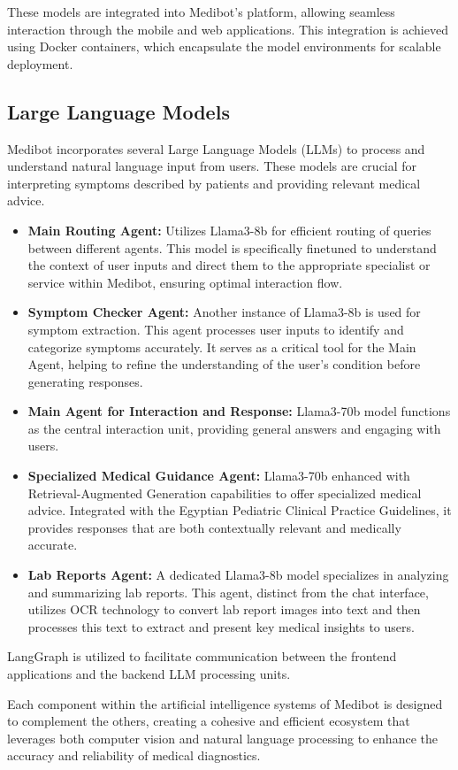 These models are integrated into Medibot’s platform, allowing seamless interaction through the mobile and web applications. This integration is achieved using Docker containers, which encapsulate the model environments for scalable deployment.

\subsection{Large Language Models}
Medibot incorporates several Large Language Models (LLMs) to process and understand natural language input from users. These models are crucial for interpreting symptoms described by patients and providing relevant medical advice.

\begin{itemize}
    \item \textbf{Main Routing Agent:} Utilizes Llama3-8b for efficient routing of queries between different agents. This model is specifically finetuned to understand the context of user inputs and direct them to the appropriate specialist or service within Medibot, ensuring optimal interaction flow.
    
    \item \textbf{Symptom Checker Agent:} Another instance of Llama3-8b is used for symptom extraction. This agent processes user inputs to identify and categorize symptoms accurately. It serves as a critical tool for the Main Agent, helping to refine the understanding of the user's condition before generating responses.
    
    \item \textbf{Main Agent for Interaction and Response:} Llama3-70b model functions as the central interaction unit, providing general answers and engaging with users.
    
    \item \textbf{Specialized Medical Guidance Agent:} Llama3-70b enhanced with Retrieval-Augmented Generation capabilities to offer specialized medical advice. Integrated with the Egyptian Pediatric Clinical Practice Guidelines, it provides responses that are both contextually relevant and medically accurate.
    
    \item \textbf{Lab Reports Agent:} A dedicated Llama3-8b model specializes in analyzing and summarizing lab reports. This agent, distinct from the chat interface, utilizes OCR technology to convert lab report images into text and then processes this text to extract and present key medical insights to users.
\end{itemize}

LangGraph is utilized to  facilitate communication between the frontend applications and the backend LLM processing units.

Each component within the artificial intelligence systems of Medibot is designed to complement the others, creating a cohesive and efficient ecosystem that leverages both computer vision and natural language processing to enhance the accuracy and reliability of medical diagnostics.